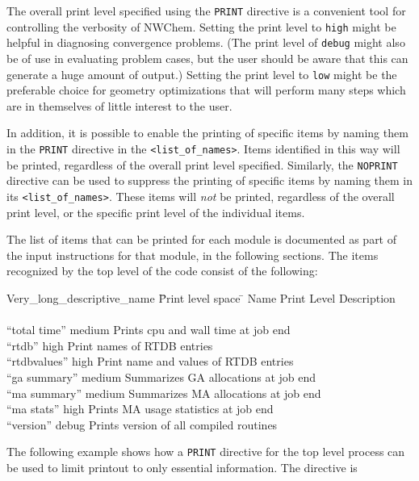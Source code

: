 The overall print level specified
using the \verb+PRINT+ directive is a convenient tool for controlling 
the verbosity
of NWChem. Setting the print level to \verb+high+ might be helpful in
diagnosing convergence problems.  (The print level of \verb+debug+ might
also be of use in evaluating problem cases, but the user should be aware
that this can generate a huge amount of output.)  Setting the print level
to \verb+low+ might be the preferable choice for geometry
optimizations that will perform many steps which are in themselves of
little interest to the user.

In addition, it is possible to enable the printing of specific
items by naming them in the \verb+PRINT+ directive in the 
\verb+<list_of_names>+.  Items identified in this way will be printed, 
regardless of the overall print level specified.  Similarly, the 
\verb+NOPRINT+ directive can be used to suppress the printing of specific
items by naming them in its \verb+<list_of_names>+.  These items will
{\em not} be printed, regardless of the overall print level, or the 
specific print level of the individual items.

The list of items that can be printed for each module is documented 
as part of the input instructions for that module, in the following
sections.  The items recognized by the top level of the code consist of
the following:
\begin{tabbing}
  Very\_long\_descriptive\_name \= Print level space \= \kill
  Name                   \> Print Level \> Description \\
                         \>        \> \\
 ``total time''        \> medium \> Prints cpu and wall time at job end\\
 ``rtdb''              \> high    \> Print names of RTDB entries\\
 ``rtdbvalues''        \> high    \> Print name and values of RTDB entries\\
 ``ga summary''        \> medium \> Summarizes GA allocations at job end \\
 ``ma summary''        \> medium \> Summarizes MA allocations at job end \\
 ``ma stats''          \> high   \> Prints MA usage statistics at job end \\
 ``version''           \> debug  \> Prints version of all compiled routines \\
\end{tabbing}


The following example shows how a \verb+PRINT+ directive for the top level
process can be used to limit printout to only essential information.
The directive is

